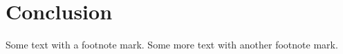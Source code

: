 \chapter{Conclusion}

Some text with a footnote mark\footnotemark[1]. 
Some more text with another footnote mark\footnotemark[2].

